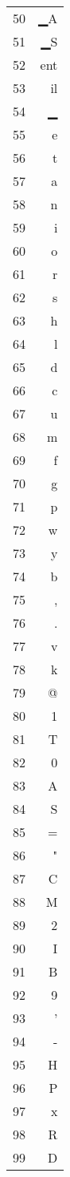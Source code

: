 \documentclass{standalone}
\begin{document}
\begin{tabular}{rr}
50 & ▁A \\
51 & ▁S \\
52 & ent \\
53 & il \\
54 & ▁ \\
55 & e \\
56 & t \\
57 & a \\
58 & n \\
59 & i \\
60 & o \\
61 & r \\
62 & s \\
63 & h \\
64 & l \\
65 & d \\
66 & c \\
67 & u \\
68 & m \\
69 & f \\
70 & g \\
71 & p \\
72 & w \\
73 & y \\
74 & b \\
75 & , \\
76 & . \\
77 & v \\
78 & k \\
79 & @ \\
80 & 1 \\
81 & T \\
82 & 0 \\
83 & A \\
84 & S \\
85 & = \\
86 & " \\
87 & C \\
88 & M \\
89 & 2 \\
90 & I \\
91 & B \\
92 & 9 \\
93 & ' \\
94 & - \\
95 & H \\
96 & P \\
97 & x \\
98 & R \\
99 & D
\end{tabular}\par\bigskip
\end{document}
